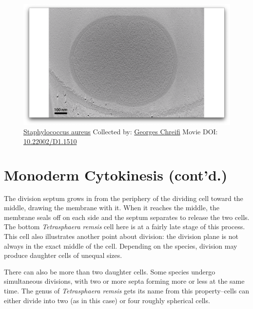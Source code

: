 \documentclass[]{tufte-book}
\begin{document}
\begin{figure}
\includegraphics{movie_stills/5_4} \caption[\protect\hyperlink{tree}{Staphylococcus aureus} Collected by:
\protect\hyperlink{georges_chreifi}{Georges Chreifi} Movie DOI:
\href{https://doi.org/10.22002/D1.1510}{10.22002/D1.1510}]{\protect\hyperlink{tree}{Staphylococcus aureus} Collected by:
\protect\hyperlink{georges_chreifi}{Georges Chreifi} Movie DOI:
\href{https://doi.org/10.22002/D1.1510}{10.22002/D1.1510}}\label{fig:5-4}
\end{figure}

\section{Monoderm Cytokinesis
(cont'd.)}\label{monoderm-cytokinesis-contd.}

The division septum grows in from the periphery of the dividing cell
toward the middle, drawing the membrane with it. When it reaches the
middle, the membrane seals off on each side and the septum separates to
release the two cells. The bottom \emph{Tetrasphaera remsis} cell here
is at a fairly late stage of this process. This cell also illustrates
another point about division: the division plane is not always in the
exact middle of the cell. Depending on the species, division may produce
daughter cells of unequal sizes.

There can also be more than two daughter cells. Some species undergo
simultaneous divisions, with two or more septa forming more or less at
the same time. The genus of \emph{Tetrasphaera remsis} gets its name
from this property--cells can either divide into two (as in this case)
or four roughly spherical cells.
\end{document}
